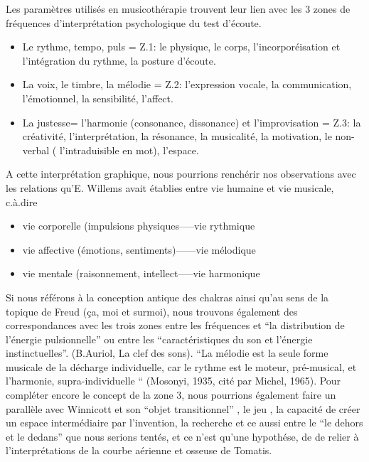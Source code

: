 Les paramètres utilisés en musicothérapie trouvent leur lien avec les
3 zones de fréquences d'interprétation psychologique du test d'écoute.
\begin{itemize}
 \item Le rythme, tempo, puls  =  Z.1: le physique, le corps, l'incorporéisation et
l'intégration du rythme,
la posture d'écoute.

\item La voix, le timbre, la mélodie =  Z.2:  l'expression vocale, la communication,
l'émotionnel, la sensibilité, l'affect.

\item La justesse= l'harmonie (consonance, dissonance) et l'improvisation = Z.3:  la créativité, l'interprétation, la
résonance, la musicalité, la motivation, le non-verbal (
l'intraduisible en mot), l'espace.
\end{itemize}
A cette interprétation graphique, nous pourrions renchérir nos
observations avec les relations
qu'E.
Willems  avait établies entre vie humaine et vie musicale, c.à.dire
\begin{itemize}
  \item vie corporelle (impulsions physiques-----vie rythmique
  \item vie affective (émotions, sentiments)------vie mélodique
    \item vie mentale (raisonnement, intellect-----vie harmonique
\end{itemize}

Si nous référons à la conception antique des chakras ainsi qu'au sens de la
topique de Freud (ça, moi et surmoi), nous trouvons également des correspondances
avec les trois zones entre les
fréquences et ``la distribution de l'énergie pulsionnelle'' ou entre
les 
``caractéristiques du son et l'énergie instinctuelles''. (B.Auriol, La
clef des sons).
``La mélodie est la seule forme musicale de la décharge individuelle, car le rythme est le moteur, pré-musical, et l'harmonie, supra-individuelle `` (Mosonyi, 1935, cité par Michel, 1965).
Pour compléter encore le concept de la zone 3, nous pourrions
également faire un parallèle avec Winnicott et son ``objet
transitionnel'' , le jeu , la capacité de créer un espace
intermédiaire par l'invention, la recherche et ce aussi entre le ``le
dehors et le dedans'' que nous serions tentés, et ce n'est qu'une
hypothése, de de relier à l'interprétations de la courbe aérienne et osseuse de Tomatis. 
 


